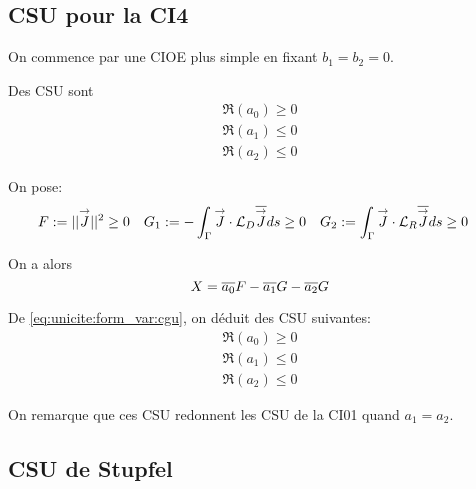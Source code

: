 

\subsection{CSU pour la CI4}

  On commence par une CIOE plus simple en fixant \(b_1=b_2=0\).

  \begin{prop}
    Des CSU sont
    \begin{align}
      \Re(a_0) \ge 0
      \\
      \Re(a_1) \le 0
      \\
      \Re(a_2) \le 0
    \end{align}
  \end{prop}

  \begin{prop}
    On pose:
    \begin{align*}
      F &:= ||{\overset{\rightarrow}{J}}|| ^2 \ge 0  & G_1 &:= -\int_\Gamma {\overset{\rightarrow}{J}}\cdot {\mathcal{L}_D}{\overline{{\overset{\rightarrow}{J}}}} ds \ge 0 & G_2 &:= \int_\Gamma {\overset{\rightarrow}{J}}\cdot {\mathcal{L}_R}{\overline{{\overset{\rightarrow}{J}}}} ds \ge 0
    \end{align*}

    On a alors
    \begin{equation*}
      X = {\overline{a_0}}F - {\overline{a_1}}G - {\overline{a_2}}G
    \end{equation*}

    De \eqref{eq:unicite:form_var:cgu}, on déduit des CSU suivantes:
    \begin{align}
      \Re\left(a_0\right) \ge 0
      \\
      \Re\left(a_1\right) \le 0
      \\
      \Re\left(a_2\right) \le 0
    \end{align}
  \end{prop}

  On remarque que ces CSU redonnent les CSU de la CI01 quand \(a_1=a_2\).

\subsection{CSU de Stupfel}

